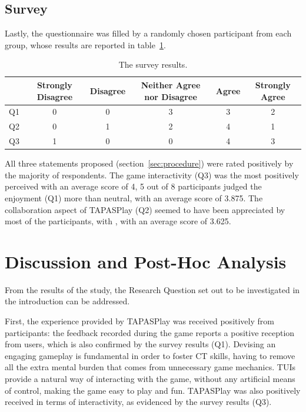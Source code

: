 \subsection{Survey}
Lastly, the questionnaire was filled by a randomly chosen participant from each group, whose results are reported in table~\ref{tab:survey}.

\begin{table}[ht!]
  \caption{The survey results.}\label{tab:survey}
  \centering
  \fontsize{10}{11}\selectfont
  \begin{tabular}{cccccc}
    \toprule
    & Strongly Disagree & Disagree & Neither Agree nor Disagree & Agree & Strongly Agree \\
    \midrule
    Q1 & 0 & 0 & 3 & 3 & 2 \\
    Q2 & 0 & 1 & 2 & 4 & 1 \\
    Q3 & 1 & 0 & 0 & 4 & 3 \\
    \bottomrule
  \end{tabular}
\end{table}

All three statements proposed (section~\ref{sec:procedure}) were rated positively by the majority of respondents. The game interactivity (Q3) was the most positively perceived with an average score of 4, 5 out of 8 participants judged the enjoyment (Q1) more than neutral, with an average score of 3.875. The collaboration aspect of TAPASPlay (Q2) seemed to have been appreciated by most of the participants, with , with an average score of 3.625.

\section{Discussion and Post-Hoc Analysis}
From the results of the study, the Research Question set out to be investigated in the introduction can be addressed.

First, the experience provided by TAPASPlay was received positively from participants: the feedback recorded during the game reports a positive reception from users, which is also confirmed by the survey results (Q1). Devising an engaging gameplay is fundamental in order to foster \ac{CT} skills, having to remove all the extra mental burden that comes from unnecessary game mechanics. \acp{TUI} provide a natural way of interacting with the game, without any artificial means of control, making the game easy to play and fun. TAPASPlay was also positively received in terms of interactivity, as evidenced by the survey results (Q3).

